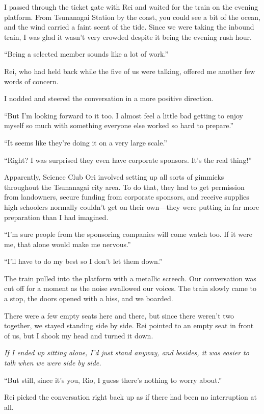 \documentclass[
    a4paper,
    12pt,
    twoside,
    openany,
    UTF8,
    fontset=windows
]{ctexbook}
\begin{document}
I passed through the ticket gate with Rei and waited for the train on the evening platform. From Tsunanagai Station by the coast, you could see a bit of the ocean, and the wind carried a faint scent of the tide. Since we were taking the inbound train, I was glad it wasn't very crowded despite it being the evening rush hour.

``Being a selected member sounds like a lot of work.''

Rei, who had held back while the five of us were talking, offered me another few words of concern.

I nodded and steered the conversation in a more positive direction.

``But I'm looking forward to it too. I almost feel a little bad getting to enjoy myself so much with something everyone else worked so hard to prepare.''

``It seems like they're doing it on a very large scale.''

``Right? I was surprised they even have corporate sponsors. It's the real thing!''

Apparently, Science Club Ori involved setting up all sorts of gimmicks throughout the Tsunanagai city area. To do that, they had to get permission from landowners, secure funding from corporate sponsors, and receive supplies high schoolers normally couldn't get on their own---they were putting in far more preparation than I had imagined.

``I'm sure people from the sponsoring companies will come watch too. If it were me, that alone would make me nervous.''

``I'll have to do my best so I don't let them down.''

The train pulled into the platform with a metallic screech. Our conversation was cut off for a moment as the noise swallowed our voices. The train slowly came to a stop, the doors opened with a hiss, and we boarded.

There were a few empty seats here and there, but since there weren't two together, we stayed standing side by side. Rei pointed to an empty seat in front of us, but I shook my head and turned it down.

\textit{If I ended up sitting alone, I'd just stand anyway, and besides, it was easier to talk when we were side by side.}

``But still, since it's you, Rio, I guess there's nothing to worry about.''

Rei picked the conversation right back up as if there had been no interruption at all.
\end{document}
